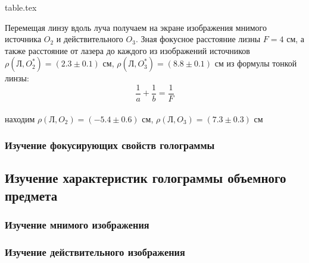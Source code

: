         {table.tex}

        Перемещая линзу вдоль луча получаем на экране изображения мнимого источника $O_2$
        и действительного $O_3$. Зная фокусное расстояние лизны $F = 4$ см, а также 
        расстояние от лазера до каждого из изображений источников 
        $\rho(\text{Л}, O_2^*) = (2.3 \pm 0.1)$ см,
        $\rho(\text{Л}, O_3^*) = (8.8 \pm 0.1)$ см из формулы тонкой линзы: 
        \\
        $$
        \frac{1}{a} + \frac{1}{b} = \frac{1}{F}
        $$
        \\
        находим $\rho(\text{Л}, O_2) = (-5.4 \pm 0.6)$ см,
        $\rho(\text{Л}, O_3) = (7.3 \pm 0.3)$ см

    \subsubsection*{Изучение фокусирующих свойств голограммы}

\subsection{Изучение характеристик голограммы объемного предмета}

    \subsubsection*{Изучение мнимого изображения}

    \subsubsection*{Изучение действительного изображения}

